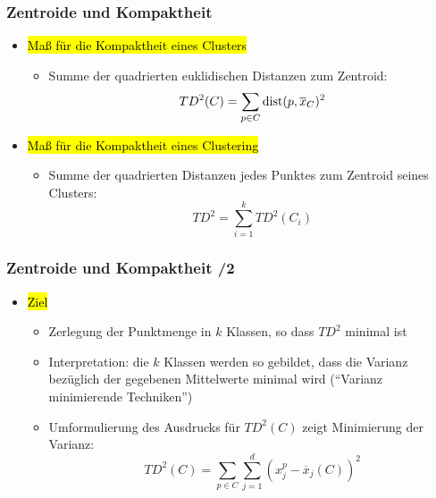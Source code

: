 \begin{frame}
\frametitle{Zentroide und Kompaktheit}

\begin{itemize}
\item \hl{Maß für die Kompaktheit eines Clusters}
\begin{itemize}
\item Summe der quadrierten euklidischen Distanzen zum Zentroid:
$$TD^2(C) = \sum_{p \in C} \operatorname{dist}(p, \overline{x}_C)^2$$
\end{itemize}
\item \hl{Maß für die Kompaktheit eines Clustering}
\begin{itemize}
\item Summe der quadrierten Distanzen jedes Punktes zum Zentroid seines
Clusters:
$$TD^2=\sum_{i=1}^k TD^2(C_i)$$
\end{itemize}

\end{itemize}

\end{frame}


\begin{frame}
\frametitle{Zentroide und Kompaktheit /2}

\begin{itemize}
\item \hl{Ziel}
\begin{itemize}
\item Zerlegung der Punktmenge in $k$ Klassen, so dass $TD^2$ minimal ist
\item Interpretation: die $k$ Klassen werden so gebildet, dass die
  Varianz bezüglich der gegebenen Mittelwerte minimal wird ("`Varianz
  minimierende Techniken"')
\item Umformulierung des Ausdrucks für $TD^2(C)$ zeigt Minimierung der
 Varianz:
$$TD^2(C) = \sum_{p \in C}\sum_{j=1}^d (x^p_j - \overline{x}_j(C))^2$$
\end{itemize}
\end{itemize}

\end{frame}


